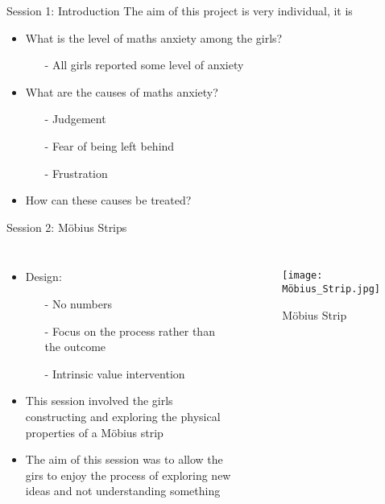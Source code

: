 \documentclass{beamer}  %
\begin{document}


\begin{frame}{Session 1: Introduction}
    The aim of this project is very individual, it is 
    \begin{itemize}
        \item What is the level of maths anxiety among the girls?
        \begin{itemize}
            \item[-]All girls reported some level of anxiety
        \end{itemize}
        \item What are the causes  of maths anxiety?
        \begin{itemize}
            \item[-] Judgement
            \item[-] Fear of being left behind
            \item[-] Frustration
        \end{itemize}
        \item How can these causes be treated?
    \end{itemize}
\end{frame}

\begin{frame}{Session 2: M\"{o}bius Strips}

    \begin{columns}
        \begin{itemize}
            \item Design:
            \begin{itemize}
                \item[-] No numbers
                \item[-] Focus on the process rather than the outcome
                \item[-] Intrinsic value intervention
            \end{itemize} 
            \item This session involved the girls constructing and exploring the physical properties of a M\"{o}bius strip
            \item The aim of this session was to allow the girs to enjoy the process of exploring new ideas and not understanding something
            
        \end{itemize}
        \begin{figure}
            \texttt{[image: Möbius\_Strip.jpg]}
            \caption{M\"{o}bius Strip}
        \end{figure}
    \end{columns}
\end{frame}
\end{document}
